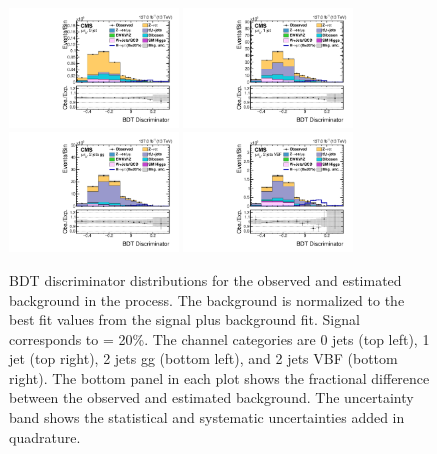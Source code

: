 \begin{figure}[htbp!]
  \centering
  \includegraphics[width=0.4\textwidth]{plots/chapter9/BDT/mue/0jet.pdf}
  \includegraphics[width=0.4\textwidth]{plots/chapter9/BDT/mue/1jet.pdf} \\
  \includegraphics[width=0.4\textwidth]{plots/chapter9/BDT/mue/2jet_gg.pdf}
  \includegraphics[width=0.4\textwidth]{plots/chapter9/BDT/mue/2jet_vbf.pdf} \\
  \caption{BDT discriminator distributions for the observed and estimated background in the \mue process. The background is normalized to the best fit values from the signal plus background fit. Signal corresponds to \BHmt = 20\%. The \mue channel categories are 0 jets (top left), 1 jet (top right), 2 jets gg (bottom left), and 2 jets VBF (bottom right). The bottom panel in each plot shows the fractional difference between the observed and estimated background. The uncertainty band shows the statistical and systematic uncertainties added in quadrature.}
  \label{fig:bdt_mue}
\end{figure}

